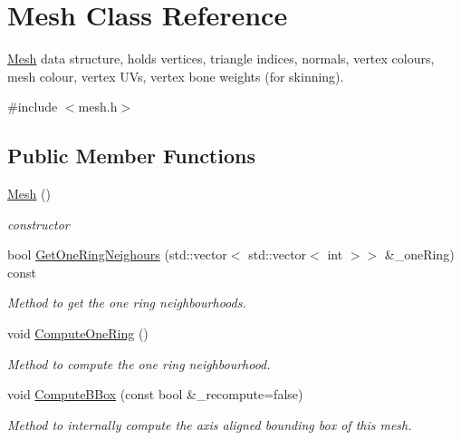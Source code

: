 \hypertarget{classMesh}{}\section{Mesh Class Reference}
\label{classMesh}


\hyperlink{classMesh}{Mesh} data structure, holds vertices, triangle indices, normals, vertex colours, mesh colour, vertex U\+Vs, vertex bone weights (for skinning).  




{\ttfamily \#include $<$mesh.\+h$>$}

\subsection*{Public Member Functions}
\begin{DoxyCompactItemize}
\item 
\hyperlink{classMesh_a2af137f1571af89172b9c102302c416b}{Mesh} ()\hypertarget{classMesh_a2af137f1571af89172b9c102302c416b}{}\label{classMesh_a2af137f1571af89172b9c102302c416b}

\begin{DoxyCompactList}\small\item\em constructor \end{DoxyCompactList}\item 
bool \hyperlink{classMesh_a933629b3306bc2fe4a7b6e9eaaecdd06}{Get\+One\+Ring\+Neighours} (std\+::vector$<$ std\+::vector$<$ int $>$$>$ \&\+\_\+one\+Ring) const 
\begin{DoxyCompactList}\small\item\em Method to get the one ring neighbourhoods. \end{DoxyCompactList}\item 
void \hyperlink{classMesh_a9228b41d6b37367e655b6fd5e719c42f}{Compute\+One\+Ring} ()\hypertarget{classMesh_a9228b41d6b37367e655b6fd5e719c42f}{}\label{classMesh_a9228b41d6b37367e655b6fd5e719c42f}

\begin{DoxyCompactList}\small\item\em Method to compute the one ring neighbourhood. \end{DoxyCompactList}\item 
void \hyperlink{classMesh_a9f8c0578b4a766b0e3cbe3df5fe42311}{Compute\+B\+Box} (const bool \&\+\_\+recompute=false)
\begin{DoxyCompactList}\small\item\em Method to internally compute the axis aligned bounding box of this mesh. \end{DoxyCompactList}\end{DoxyCompactItemize}
